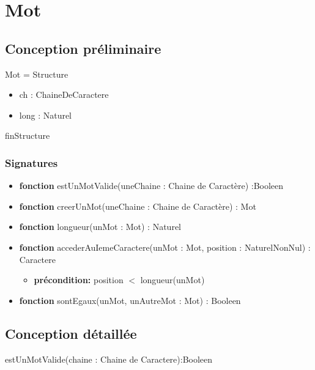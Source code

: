 \documentclass{article}
\begin{document}
    \pagestyle{empty}
    \noindent

    \section*{Mot}
    \subsection*{Conception préliminaire}

     Mot = Structure
	\begin{itemize}[label=$\ $, leftmargin=2cm]
		 \item ch : ChaineDeCaractere
		 \item long : Naturel
	\end{itemize}
    finStructure
    
    \subsubsection*{Signatures}

	\begin{itemize}[label=$\ $, leftmargin=1cm]
		 \item \textbf{fonction} estUnMotValide(uneChaine : Chaine de Caractère) :Booleen
		 \item \textbf{fonction} creerUnMot(uneChaine : Chaine de Caractère) : Mot
		 \item \textbf{fonction} longueur(unMot : Mot) : Naturel
		 \item \textbf{fonction} accederAuIemeCaractere(unMot : Mot, position : NaturelNonNul) : Caractere
		 \begin{itemize}[label=$| $]
            \item \textbf{précondition:} position $<$ longueur(unMot)
         \end{itemize}
         \item \textbf{fonction} sontEgaux(unMot, unAutreMot : Mot) : Booleen
	\end{itemize} 

    \subsection*{Conception détaillée}

    \begin{function}
        \SetAlgoLined
        \caption{estUnMotValide(chaine : Chaine de Caractere):Booleen}
    \end{function}
        
\end{document}
